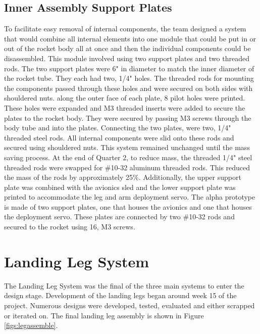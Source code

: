 \subsection{Inner Assembly Support Plates}
To facilitate easy removal of internal components, the team designed a system that would combine all internal elements into one module that could be put in or out of the rocket body all at once and then the individual components could be disassembled. This module involved using two support plates and two threaded rods. The two support plates were 6" in diameter to match the inner diameter of the rocket tube. They each had two, 1/4" holes. The threaded rods for mounting the components passed through these holes and were secured on both sides with shouldered nuts. along the outer face of each plate, 8 pilot holes were printed. These holes were expanded and M3 threaded inserts were added to secure the plates to the rocket body. They were secured by passing M3 screws through the body tube and into the plates. Connecting the two plates, were two, 1/4" threaded steel rods. All internal components were slid onto these rods and secured using shouldered nuts. This system remained unchanged until the mass saving process. At the end of Quarter 2, to reduce mass, the threaded 1/4" steel threaded rods were swapped for \#10-32 aluminum threaded rods. This reduced the mass of the rods by approximately 25\%. Additionally, the upper support plate was combined with the avionics sled and the lower support plate was printed to accommodate the leg and arm deployment servo. The alpha prototype is made of two support plates, one that houses the avionics and one that houses the deployment servo. These plates are connected by two \#10-32 rods and secured to the rocket using 16, M3 screws.

\section{Landing Leg System}
The Landing Leg System was the final of the three main systems to enter the design stage. Development of the landing legs began around week 15 of the project. Numerous designs were developed, tested, evaluated and either scrapped or iterated on. The final landing leg assembly is shown in Figure \ref{figs:legassemble}. 


